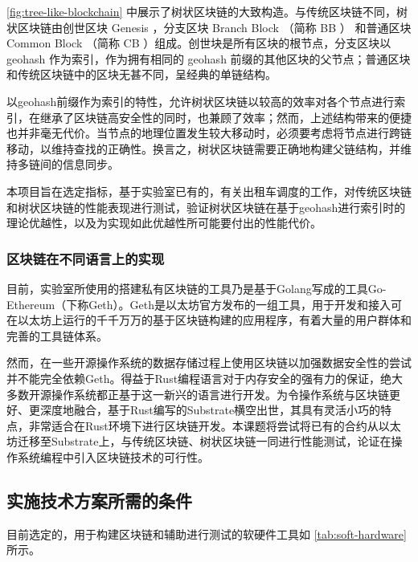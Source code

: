 \documentclass[type=undergraduate_proposal]{bitreport}
\begin{document}
\ref{fig:tree-like-blockchain} 中展示了树状区块链的大致构造。与传统区块链不同，树状区块链由创世区块 Genesis ，分支区块 Branch Block （简称 BB ） 和普通区块 Common Block （简称 CB ）组成。创世块是所有区块的根节点，分支区块以 geohash 作为索引，作为拥有相同的 geohash 前缀的其他区块的父节点；普通区块和传统区块链中的区块无甚不同，呈经典的单链结构。

以geohash前缀作为索引的特性，允许树状区块链以较高的效率对各个节点进行索引，在继承了区块链高安全性的同时，也兼顾了效率；然而，上述结构带来的便捷也并非毫无代价。当节点的地理位置发生较大移动时，必须要考虑将节点进行跨链移动，以维持查找的正确性。换言之，树状区块链需要正确地构建父链结构，并维持多链间的信息同步。

本项目旨在选定指标，基于实验室已有的，有关出租车调度的工作，对传统区块链和树状区块链的性能表现进行测试，验证树状区块链在基于geohash进行索引时的理论优越性，以及为实现如此优越性所可能要付出的性能代价。

\subsubsection{区块链在不同语言上的实现}
目前，实验室所使用的搭建私有区块链的工具乃是基于Golang写成的工具Go-Ethereum\cite{about_geth}（下称Geth）。Geth是以太坊官方发布的一组工具，用于开发和接入可在以太坊上运行的千千万万的基于区块链构建的应用程序，有着大量的用户群体和完善的工具链体系。

然而，在一些开源操作系统的数据存储过程上使用区块链以加强数据安全性的尝试并不能完全依赖Geth。得益于Rust编程语言对于内存安全的强有力的保证\cite{system_programming}，绝大多数开源操作系统都正基于这一新兴的语言进行开发。为令操作系统与区块链更好、更深度地融合，基于Rust编写的Substrate横空出世\cite{about_substrate}，其具有灵活小巧的特点，非常适合在Rust环境下进行区块链开发。本课题将尝试将已有的合约从以太坊迁移至Substrate上，与传统区块链、树状区块链一同进行性能测试，论证在操作系统编程中引入区块链技术的可行性。

\subsection{实施技术方案所需的条件}

目前选定的，用于构建区块链和辅助进行测试的软硬件工具如 \ref{tab:soft-hardware} 所示。
\end{document}
